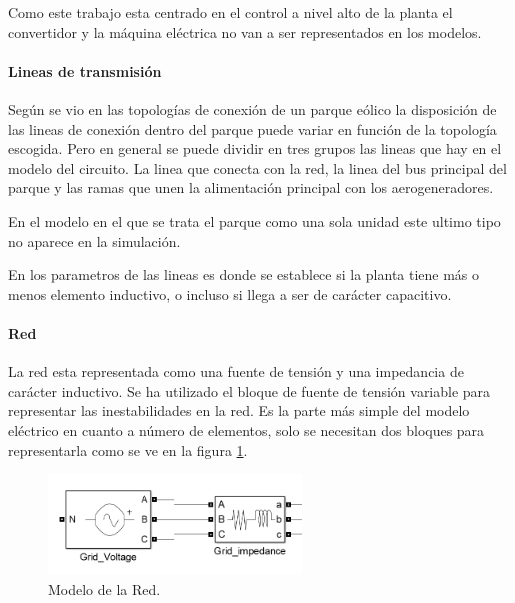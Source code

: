 \documentclass{book}
\begin{document}
Como este trabajo esta centrado en el control a nivel alto de la planta el convertidor y la m\'aquina el\'ectrica no van a ser representados en los modelos. \par
		
		\paragraph{Lineas de transmisi\'on}

Seg\'un se vio en las topolog\'ias de conexi\'on de un parque e\'olico la disposici\'on de las lineas de conexi\'on dentro del parque puede variar en funci\'on de la topolog\'ia escogida. Pero en general se puede dividir en tres grupos las lineas que hay en el modelo del circuito. La linea que conecta con la red, la linea del bus principal del parque y las ramas que unen la alimentaci\'on principal con los aerogeneradores. \par

En el modelo en el que se trata el parque como una sola unidad este ultimo tipo no aparece en la simulaci\'on. \par

En los parametros de las lineas es donde se establece si la planta tiene más o menos elemento inductivo, o incluso si llega a ser de car\'acter capacitivo. \par


		\paragraph{Red} 

La red esta representada como una fuente de tensi\'on y una impedancia de car\'acter inductivo. Se ha utilizado el bloque de fuente de tensi\'on variable para representar las inestabilidades en la red. Es la parte más simple del modelo el\'ectrico en cuanto a n\'umero de elementos, solo se necesitan dos bloques para representarla como se ve en la figura \ref{GridSimulink}. \par

\begin{figure}[h!]
\centering
\includegraphics[width=0.6\textwidth]{GridSimulink.PNG}
\caption{Modelo de la Red. }
\label{GridSimulink}
\end{figure} \par
\end{document}
